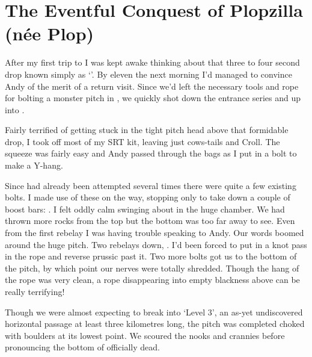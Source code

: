 


\section{The Eventful Conquest of Plopzilla (née Plop)}


After my first trip to  I was kept awake thinking about that
three to four second drop known simply as `'. By eleven the next
morning I'd managed to convince Andy of the merit of a return visit.
Since we'd left the necessary tools and rope for bolting a monster pitch in , we quickly shot down the  entrance series and
up  into .

Fairly terrified of getting stuck in the tight pitch head above that
formidable drop, I took off most of my SRT kit, leaving just cows-tails
and Croll. The squeeze was fairly easy and Andy passed through the bags as I put in a bolt to make a Y-hang.

Since  had already been attempted several times there were quite a few existing bolts. I made use of these on the way, stopping only to take down a couple of boost bars: . I felt oddly calm swinging about in the huge chamber. We had thrown more rocks from the top but the bottom was too far away to see. Even from the first rebelay I was having trouble speaking to Andy. Our words boomed around the huge pitch. Two rebelays down, . I'd been forced to put in a knot pass in the rope and reverse prussic past it. Two more bolts got us to the bottom of the pitch, by which point our nerves were totally shredded.
Though the hang of the rope was very clean, a rope disappearing into
empty blackness above can be really terrifying!

Though we were almost expecting to break into `Level 3', an as-yet
undiscovered horizontal passage at least three kilometres long, the
pitch was completed choked with boulders at its lowest point. We scoured
the nooks and crannies before pronouncing the bottom of  officially
dead.

